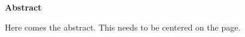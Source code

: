 \chapter*{}

\vspace*{\fill}
\begin{center}

\textbf{\Large Abstract}
\vspace{5ex}	

\begin{minipage}{.8\textwidth}
	
Here comes the abstract. This needs to be centered on the page.

\end{minipage}
\end{center}
\vspace*{\fill}
